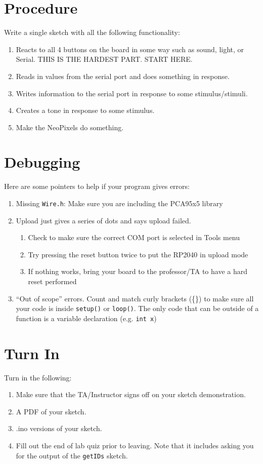 \section{Procedure}
Write a single sketch with all the following functionality:
\begin{enumerate}
    \item Reacts to all 4 buttons on the board in some way such as sound, light, or Serial. 
            THIS IS THE HARDEST PART. START HERE.
    \item Reads in values from the serial port and does something in response.
    \item Writes information to the serial port in response to some stimulus/stimuli.
    \item Creates a tone in response to some stimulus.
    \item Make the NeoPixels do something.
\end{enumerate}

\section{Debugging}
Here are some pointers to help if your program gives errors:
\begin{enumerate}
    \item Missing \lstinline|Wire.h|: Make sure you are including the PCA95x5 library
    \item Upload just gives a series of dots and says upload failed.
    \begin{enumerate}
        \item Check to make sure the correct COM port is selected in Tools menu
        \item Try pressing the reset button twice to put the RP2040 in upload mode 
        \item If nothing works, bring your board to the professor/TA to have a hard reset performed
    \end{enumerate}
    \item ``Out of scope'' errors. Count and match curly brackets (\{\}) to make sure all
                your code is inside \lstinline|setup()| or \lstinline|loop()|. The only code
                that can be outside of a function is a variable declaration (e.g. \lstinline|int x|)
\end{enumerate}

\section{Turn In}
Turn in the following:
\begin{enumerate}
    \item Make sure that the TA/Instructor signs off on your sketch demonstration.
    \item A PDF of your sketch.
    \item .ino versions of your sketch.
    \item Fill out the end of lab quiz prior to leaving. Note that it includes asking you 
            for the output of the \lstinline$getIDs$ sketch. 
\end{enumerate}